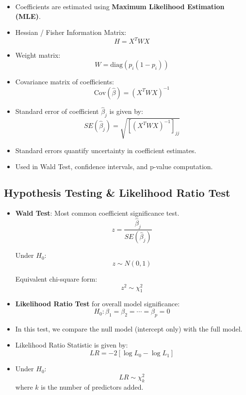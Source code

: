 \documentclass[10pt,a4paper]{article}
\begin{document}
	\begin{itemize}
	    \item Coefficients are estimated using \textbf{Maximum Likelihood Estimation (MLE)}.
	    
	    \item Hessian / Fisher Information Matrix:
	    $$
	    H = X^T W X
	    $$
	    
	    \item Weight matrix:
	    $$
	    W = \mathrm{diag}(p_i(1-p_i))
	    $$
	    
	    \item Covariance matrix of coefficients:
	    $$
	    \mathrm{Cov}(\hat{\beta}) = (X^T W X)^{-1}
	    $$
	    
	    \item Standard error of coefficient $\hat{\beta}_j$ is given by:
	    $$
	    SE(\hat{\beta}_j)=\sqrt{\left[(X^T W X)^{-1}\right]_{jj}}
	    $$
	    
	    \item Standard errors quantify uncertainty in coefficient estimates.
	    
	    \item Used in Wald Test, confidence intervals, and p-value computation.
	\end{itemize}
	
	\subsection{Hypothesis Testing \& Likelihood Ratio Test}
	
	\begin{itemize}
	    \item \textbf{Wald Test}: Most common coefficient significance test.
	    $$
	    z = \frac{\hat{\beta}_j}{SE(\hat{\beta}_j)}
	    $$
	    
	    Under $H_0$:
	    $$
	    z \sim N(0,1)
	    $$
	    
	    Equivalent chi-square form:
	    $$
	    z^2 \sim \chi^2_1
	    $$
	    
	    \item \textbf{Likelihood Ratio Test} for overall model significance:
	    $$
	    H_0:\beta_1 = \beta_2 = \cdots = \beta_p = 0
	    $$
	    
	    \item In this test, we compare the null model (intercept only) with the full model.
	    
	    \item Likelihood Ratio Statistic is given by:
	    $$
	    LR=-2\left[\log L_0 - \log L_1\right]
	    $$
	    
	    \item Under $H_0$:
	    $$
	    LR \sim \chi^2_k
	    $$
	    where $k$ is the number of predictors added.
	\end{itemize}
	
\end{document}
